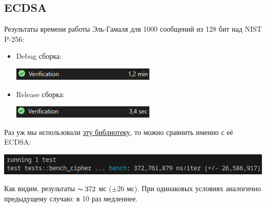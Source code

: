 \subsection{ECDSA}
Результаты времени работы Эль-Гамаля для 1000 сообщений из 128 бит над NIST P-256:
\begin{itemize}
  \item Debug сборка:

    \begin{center}
      \includegraphics{images/ecdsa_debug.png}
    \end{center}

  \item Release сборка:

    \begin{center}
      \includegraphics{images/ecdsa_release.png}
    \end{center}
\end{itemize}

Раз уж мы использовали \href{https://github.com/RustCrypto/elliptic-curves/tree/master/p256}{эту библиотеку}, то можно сравнить именно с её ECDSA:

\begin{center}
  \includegraphics{images/outsoucre_ecdsa.png}
\end{center}

Как видим, результаты $\thicksim 372$ мс ($\pm26$ мс). При одинаковых условиях аналогично предыдущему случаю: в 10 раз медленнее.

